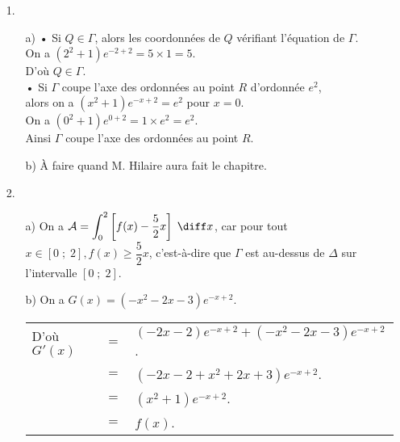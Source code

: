 \begin{itemize}
\item[1.] 
\begin{itemize}
\item[a)] • Si $Q \in \Gamma$, alors les coordonnées de $Q$ vérifiant l'équation de $\Gamma$. \\

On a $\left(2^2 + 1\right)e^{-2+2} = 5 \times 1 = 5$. \\

D'où $Q \in \Gamma$. \\

• Si $\Gamma$ coupe l'axe des ordonnées au point $R$ d'ordonnée $e^2$, \\ alors on a $\left(x^2+1\right)e^{-x+2} = e^2$ pour $x = 0$. \\

On a $\left(0^2 + 1\right)e^{0+2} = 1 \times e^2 = e^2$. \\

Ainsi $\Gamma$ coupe l'axe des ordonnées au point $R$. \\

\item[b)] À faire quand M. Hilaire aura fait le chapitre. \\
\end{itemize}

\item[2.] 

\begin{itemize}
\item[a)] On a $\mathcal{A} = \displaystyle{\int_0^2 \left[f(x) - \dfrac{5}{2}x\right] \; \diff x}$, car pour tout $x \in \left[0 \; ; \; 2\right], f(x) \geqslant \dfrac{5}{2}x$, c'est-à-dire que $\Gamma$ est au-dessus de $\Delta$ sur l'intervalle $\left[0 \; ; \; 2\right]$. \\

\item[b)] On a $G(x) = \left(-x^2 - 2x - 3\right)e^{-x+2}$. \\

\begin{tabular}{lll}
\hspace*{-.3cm} D'où $G'(x)$ & $=$ & $\left(-2x-2\right)e^{-x+2} + \left(-x^2-2x-3\right)e^{-x+2}$. \\
& $=$ & $\left(-2x-2+x^2+2x+3\right)e^{-x+2}$. \\
& $=$ & $\left(x^2 + 1\right)e^{-x+2}$. \\
& $=$ & $f(x)$. \\
\end{tabular}


\end{itemize}
\end{itemize}
